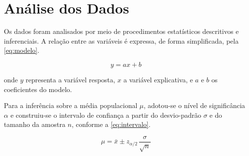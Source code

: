 \section{Análise dos Dados}
\label{sec:analise-dos-dados}

Os dados foram analisados por meio de procedimentos estatísticos descritivos e inferenciais. A relação entre as variáveis é expressa, de forma simplificada, pela \autoref{eq:modelo}.

\begin{equation}
    \label{eq:modelo}
    y = ax + b
\end{equation}

\noindent onde $y$ representa a variável resposta, $x$ a variável explicativa, e $a$ e $b$ os coeficientes do modelo.

Para a inferência sobre a média populacional $\mu$, adotou-se o nível de significância $\alpha$ e construiu-se o intervalo de confiança a partir do desvio-padrão $\sigma$ e do tamanho da amostra $n$, conforme a \autoref{eq:intervalo}.

\begin{equation}
    \label{eq:intervalo}
    \mu = \bar{x} \pm z_{\alpha/2}\,\frac{\sigma}{\sqrt{n}}
\end{equation}

%
%
